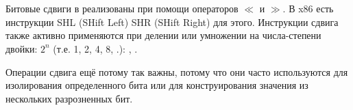 \section{\ShiftsSectionName}

Битовые сдвиги в \CCpp реализованы при помощи операторов $\ll$ и $\gg$.
В x86 есть инструкции SHL (SHift Left) \AndENRU SHR (SHift Right) для этого.
Инструкции сдвига также активно применяются при делении или умножении на числа-степени двойки: $2^{n}$ (т.е. 1, 2, 4, 8, \etc{}.):
,
.


Операции сдвига ещё потому так важны, потому что они часто используются для изолирования
определенного бита или для конструирования значения из нескольких разрозненных бит.

